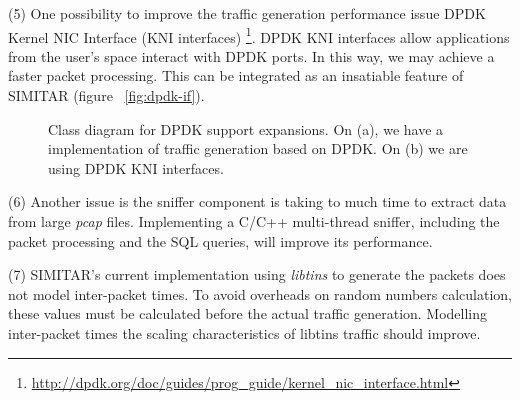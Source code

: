 (5) One possibility to improve the traffic generation performance issue DPDK Kernel NIC Interface  (KNI interfaces) \footnote{\href{http://dpdk.org/doc/guides/prog_guide/kernel_nic_interface.html}{http://dpdk.org/doc/guides/prog\_guide/kernel\_nic\_interface.html}}. DPDK KNI interfaces allow applications from the user's space interact with DPDK ports. In this way, we may achieve a faster packet processing. This can be integrated as an insatiable feature of SIMITAR (figure ~\ref{fig:dpdk-if}).


\begin{figure}[h!]
	\centering
	\hspace{0mm}
	\caption{Class diagram for DPDK support expansions. On (a), we have a implementation of traffic generation based on DPDK. On (b) we are using DPDK KNI interfaces.}
	\label{fig:DpdkFlow}
\end{figure}

(6) Another issue is the sniffer component is taking to much time to extract data from large \textit{pcap} files. Implementing a C/C++ multi-thread sniffer, including the packet processing and the SQL queries, will improve its performance. 


(7) SIMITAR's current implementation using \textit{libtins} to generate the packets does not model inter-packet times. To avoid overheads on random numbers calculation,  these values must be calculated before the actual traffic generation. Modelling inter-packet times the scaling characteristics of libtins traffic should improve. 


